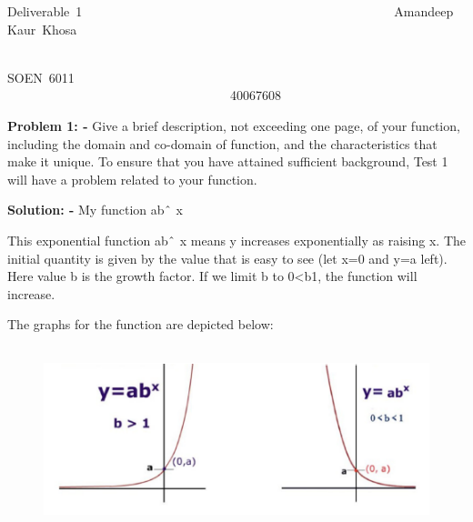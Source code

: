 \documentclass[12pt]{article}
\begin{document}
\begin{justify}
Deliverable\ 1\ \ \ \ \ \ \ \ \ \ \ \ \ \ \ \ \ \ \ \ \ \ \ \ \ \ \ \ \ \ \ \ \ \ \ \ \ \ \ \ \ \ \ \ \ \ \ \ \ Amandeep\ Kaur\ Khosa\ \ \ \ \ \ \ \ \ \ \ \ \ \ \ \ \ \ \ \ \ \ \ \ \ \ \ \ \ \ \ \ \ \ \ \ \ \ \ \ \ \ \ \ \ \ \ \ \ \ \ \ \ \ \ \ \ \ \ \ \ \ \ \ \ \ \ \ \ \ \ \ \ \ \ \ \ \ \ \ \ \ \ \ \ \ \ \ \ \ \ \ \ \ \ \ \ \ \ \ \ \ \ \ \ \ \ \ \ \ \ \ \ \ \      
\end{justify}\par

SOEN\ 6011\ \ \ \ \ \ \ \ \ \ \ \ \ \ \ \ \ \ \ \ \ \ \ \ \ \ \ \ \ \ \ \ \ \ \ \ \ \ \ \ \ \ \ \ \ \ \ \ \ \ \ \ \ \ \ \ \ \ \ \ \ \ \ \ \ \ \ \ \ \ \ \ \ \ \ \ \ \ \ \ \ \ \ \ \ \ \ \ \ \ \ \ \ \ \ \   40067608\par


\vspace{\baselineskip}
\textbf{Problem 1: - }Give a brief description, not exceeding one page, of your function, including the domain and co-domain of function, and the characteristics that make it unique. To ensure that you have attained sufficient background, Test 1 will have a problem related to your function.\par


\vspace{\baselineskip}
\textbf{Solution: - }My function ab$ \string^ $ x\par

This exponential function ab$ \string^ $ x means y increases exponentially as raising x. The initial quantity is given by the value that is easy to see (let x=0 and y=a left). Here value b is the growth factor. If we limit b to 0<b1, the function will increase.\par


\vspace{\baselineskip}
The graphs for the function are depicted below:\par




\begin{figure}[H]
\advance\leftskip 0.0in		\includegraphics[width=5.67in,height=2.12in]{image1.PNG}
\end{figure}
\end{document}
